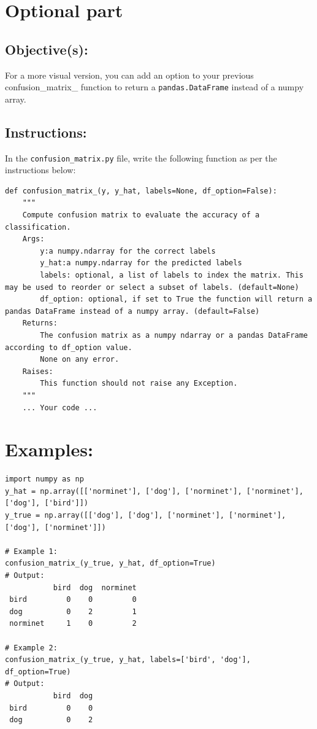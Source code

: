 \documentclass{42-en}
\begin{document}
\section{Optional part}

\subsection{Objective(s):}

For a more visual version, you can add an option to your previous confusion\_matrix\_ function to return a \texttt{pandas.DataFrame} instead of a numpy array.

\subsection{Instructions:}

In the \texttt{confusion\_matrix.py} file, write the following function as per the instructions below:
\begin{verbatim}
def confusion_matrix_(y, y_hat, labels=None, df_option=False):
    """
    Compute confusion matrix to evaluate the accuracy of a classification.
    Args:
        y:a numpy.ndarray for the correct labels
        y_hat:a numpy.ndarray for the predicted labels
        labels: optional, a list of labels to index the matrix. This may be used to reorder or select a subset of labels. (default=None)
        df_option: optional, if set to True the function will return a pandas DataFrame instead of a numpy array. (default=False)
    Returns: 
        The confusion matrix as a numpy ndarray or a pandas DataFrame according to df_option value.
        None on any error.
    Raises:
        This function should not raise any Exception.
    """
    ... Your code ...
\end{verbatim}

\section{Examples:}
\begin{verbatim}
import numpy as np
y_hat = np.array([['norminet'], ['dog'], ['norminet'], ['norminet'], ['dog'], ['bird']])
y_true = np.array([['dog'], ['dog'], ['norminet'], ['norminet'], ['dog'], ['norminet']])

# Example 1: 
confusion_matrix_(y_true, y_hat, df_option=True)
# Output:
           bird  dog  norminet
 bird         0    0         0
 dog          0    2         1
 norminet     1    0         2

# Example 2:
confusion_matrix_(y_true, y_hat, labels=['bird', 'dog'], df_option=True)
# Output:
           bird  dog
 bird         0    0
 dog          0    2
\end{verbatim}
\end{document}
